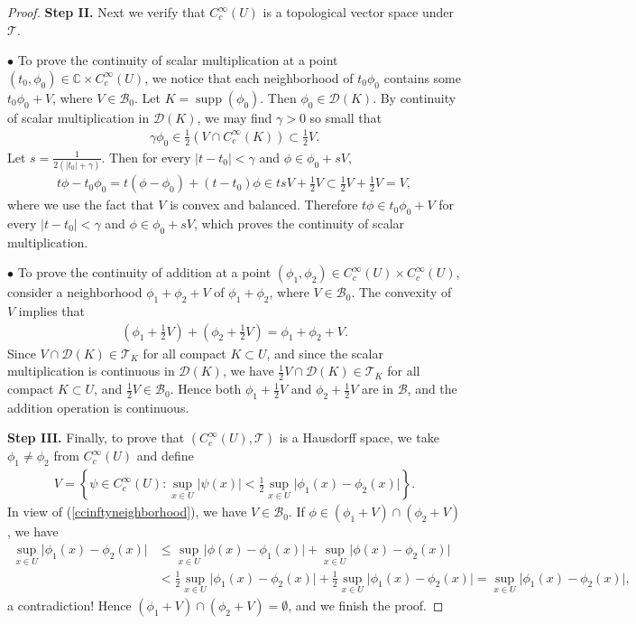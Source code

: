 \documentclass{article}
\numberwithin{equation}{section}
\newcommand{\bbC}{\mathbb{C}}
\newcommand{\scr}{\mathscr}
\renewcommand{\cal}{\mathcal}
\DeclareMathOperator{\supp}{supp}
\theoremstyle{plain}
\theoremstyle{definition}
\begin{document}
\begin{proof}
\item\textbf{Step II.} Next we verify that $C_c^\infty(U)$ is a topological vector space under $\scr{T}$.
\item$\bullet$ To prove the continuity of scalar multiplication at a point $(t_0,\phi_0)\in\bbC\times C_c^\infty(U)$, we notice that each neighborhood of $t_0\phi_0$ contains some $t_0\phi_0+V$, where $V\in\scr{B}_0$. Let $K=\supp(\phi_0)$. Then $\phi_0\in \cal{D}(K)$. By continuity of scalar multiplication in $\cal{D}(K)$, we may find $\gamma>0$ so small that
\begin{align*}
	\gamma\phi_0\in\frac{1}{2}\left(V\cap C_c^\infty(K)\right)\subset\frac{1}{2}V.
\end{align*}
Let $s=\frac{1}{2(\vert t_0\vert+\gamma)}$. Then for every $\vert t-t_0\vert<\gamma$ and $\phi\in\phi_0+sV$,
\begin{align*}
	t\phi-t_0\phi_0=t(\phi-\phi_0)+(t-t_0)\phi\in tsV+\frac{1}{2}V\subset\frac{1}{2}V+\frac{1}{2}V=V,
\end{align*}
where we use the fact that $V$ is convex and balanced. Therefore $t\phi\in t_0\phi_0+V$ for every $\vert t-t_0\vert<\gamma$ and $\phi\in\phi_0+sV$, which proves the continuity of scalar multiplication.
\item$\bullet$ To prove the continuity of addition at a point $(\phi_1,\phi_2)\in C_c^\infty(U)\times C_c^\infty(U)$, consider a neighborhood $\phi_1+\phi_2+V$ of $\phi_1+\phi_2$, where $V\in\scr{B}_0$. The convexity of $V$ implies that
\begin{align*}
	\left(\phi_1+\frac{1}{2}V\right)+\left(\phi_2+\frac{1}{2}V\right)=\phi_1+\phi_2+V.
\end{align*}
Since $V\cap \cal{D}(K)\in\scr{T}_K$ for all compact $K\subset U$, and since the scalar multiplication is continuous in $\cal{D}(K)$, we have $\frac{1}{2}V\cap\cal{D}(K)\in\scr{T}_K$ for all compact $K\subset U$, and $\frac{1}{2}V\in\mathscr{B}_0$. Hence both $\phi_1+\frac{1}{2}V$ and $\phi_2+\frac{1}{2}V$ are in $\mathscr{B}$, and the addition operation is continuous.

\item\textbf{Step III.} Finally, to prove that $(C_c^\infty(U),\scr{T})$ is a Hausdorff space, we take $\phi_1\neq\phi_2$ from $C_c^\infty(U)$ and define
\begin{align*}
	V=\left\{\psi\in C_c^\infty(U):\sup_{x\in U}\vert\psi(x)\vert<\frac{1}{2}\sup_{x\in U}\vert\phi_1(x)-\phi_2(x)\vert\right\}.
\end{align*}
In view of (\ref{ccinftyneighborhood}), we have $V\in\mathscr{B}_0$. If $\phi\in(\phi_1+V)\cap(\phi_2+V)$, we have
\begin{align*}
	\sup_{x\in U}\vert\phi_1(x)-\phi_2(x)\vert&\leq\sup_{x\in U}\vert\phi(x)-\phi_1(x)\vert+\sup_{x\in U}\vert\phi(x)-\phi_2(x)\vert\\
	&<\frac{1}{2}\sup_{x\in U}\vert\phi_1(x)-\phi_2(x)\vert+\frac{1}{2}\sup_{x\in U}\vert\phi_1(x)-\phi_2(x)\vert=\sup_{x\in U}\vert\phi_1(x)-\phi_2(x)\vert,
\end{align*}
a contradiction! Hence $(\phi_1+V)\cap(\phi_2+V)=\emptyset$, and we finish the proof.
\end{proof}
\end{document}
